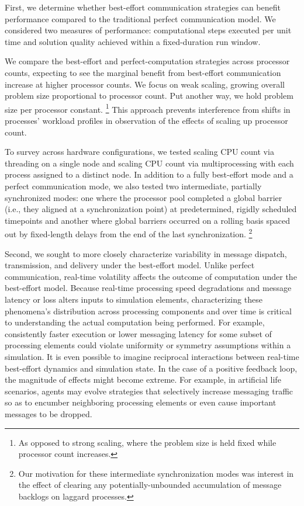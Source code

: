 First, we determine whether best-effort communication strategies can benefit performance compared to the traditional perfect communication model.
We considered two measures of performance: computational steps executed per unit time and solution quality achieved within a fixed-duration run window.

We compare the best-effort and perfect-computation strategies across processor counts, expecting to see the marginal benefit from best-effort communication increase at higher processor counts.
We focus on weak scaling, growing overall problem size proportional to processor count.
Put another way, we hold problem size per processor constant.%
\footnote{
As opposed to strong scaling, where the problem size is held fixed while processor count increases.
}
This approach prevents interference from shifts in processes' workload profiles in observation of the effects of scaling up processor count.

To survey across hardware configurations, we tested scaling CPU count via threading on a single node and scaling CPU count via multiprocessing with each process assigned to a distinct node.
In addition to a fully best-effort mode and a perfect communication mode, we also tested two intermediate, partially synchronized modes: one where the processor pool completed a global barrier (i.e., they aligned at a synchronization point) at predetermined, rigidly scheduled timepoints and another where global barriers occurred on a rolling basis spaced out by fixed-length delays from the end of the last synchronization.%
\footnote{
Our motivation for these intermediate synchronization modes was interest in the effect of clearing any potentially-unbounded accumulation of message backlogs on laggard processes.
}

Second, we sought to more closely characterize variability in message dispatch, transmission, and delivery under the best-effort model.
Unlike perfect communication, real-time volatility affects the outcome of computation under the best-effort model.
Because real-time processing speed degradations and message latency or loss alters inputs to simulation elements, characterizing these phenomena's distribution across processing components and over time is critical to understanding the actual computation being performed.
For example, consistently faster execution or lower messaging latency for some subset of processing elements could violate uniformity or symmetry assumptions within a simulation.
It is even possible to imagine reciprocal interactions between real-time best-effort dynamics and simulation state.
In the case of a positive feedback loop, the magnitude of effects might become extreme.
For example, in artificial life scenarios, agents may evolve strategies that selectively increase messaging traffic so as to encumber neighboring processing elements or even cause important messages to be dropped.

